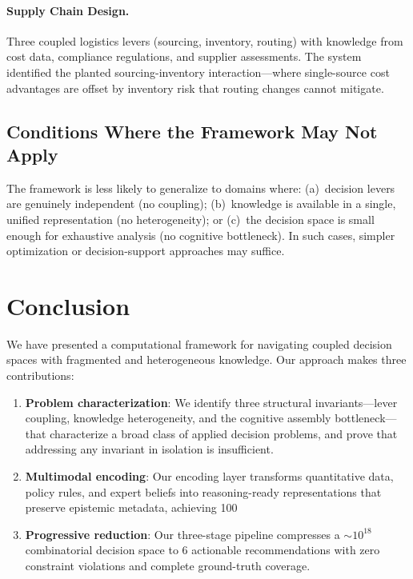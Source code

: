 \documentclass[11pt,a4paper]{article}
\begin{document}
\paragraph{Supply Chain Design.}
Three coupled logistics levers (sourcing, inventory, routing) with knowledge from cost data, compliance regulations, and supplier assessments.
The system identified the planted sourcing-inventory interaction---where single-source cost advantages are offset by inventory risk that routing changes cannot mitigate.

\subsection{Conditions Where the Framework May Not Apply}

The framework is less likely to generalize to domains where:
(a)~decision levers are genuinely independent (no coupling);
(b)~knowledge is available in a single, unified representation (no heterogeneity); or
(c)~the decision space is small enough for exhaustive analysis (no cognitive bottleneck).
In such cases, simpler optimization or decision-support approaches may suffice.


\section{Conclusion}
\label{sec:conclusion}

We have presented a computational framework for navigating coupled decision spaces with fragmented and heterogeneous knowledge.
Our approach makes three contributions:

\begin{enumerate}
    \item \textbf{Problem characterization}: We identify three structural invariants---lever coupling, knowledge heterogeneity, and the cognitive assembly bottleneck---that characterize a broad class of applied decision problems, and prove that addressing any invariant in isolation is insufficient.

    \item \textbf{Multimodal encoding}: Our encoding layer transforms quantitative data, policy rules, and expert beliefs into reasoning-ready representations that preserve epistemic metadata, achieving 100%

    \item \textbf{Progressive reduction}: Our three-stage pipeline compresses a ${\sim}10^{18}$ combinatorial decision space to 6 actionable recommendations with zero constraint violations and complete ground-truth coverage.
\end{enumerate}
\end{document}
